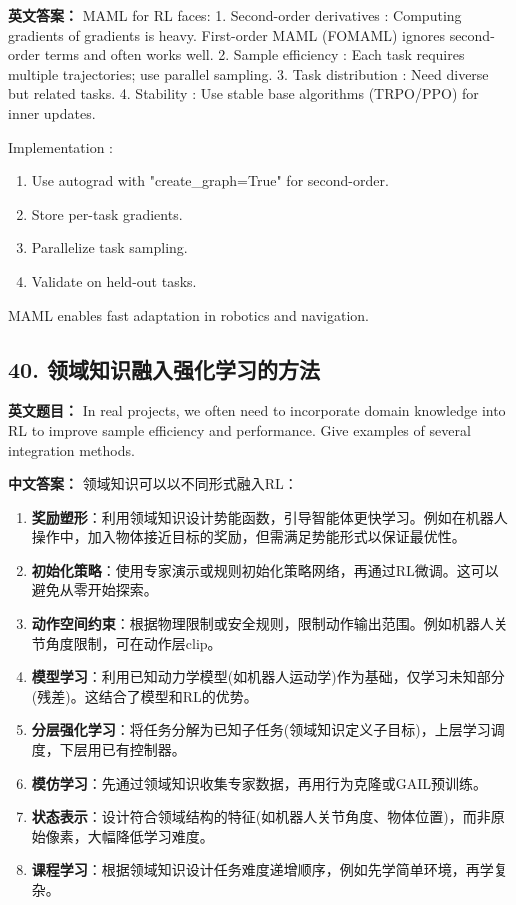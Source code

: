 \documentclass[10pt,a4paper]{ctexart}
\begin{document}
\textbf{英文答案：}  
MAML for RL faces:
1.  Second-order derivatives : Computing gradients of gradients is heavy. First-order MAML (FOMAML) ignores second-order terms and often works well.
2.  Sample efficiency : Each task requires multiple trajectories; use parallel sampling.
3.  Task distribution : Need diverse but related tasks.
4.  Stability : Use stable base algorithms (TRPO/PPO) for inner updates.

 Implementation :
\begin{enumerate}
    \item Use autograd with "create_graph=True" for second-order.
    \item Store per-task gradients.
    \item Parallelize task sampling.
    \item Validate on held-out tasks.
\end{enumerate}

MAML enables fast adaptation in robotics and navigation.

\subsection*{40. 领域知识融入强化学习的方法}
\textbf{英文题目：} In real projects, we often need to incorporate domain knowledge into RL to improve sample efficiency and performance. Give examples of several integration methods.

\textbf{中文答案：}  
领域知识可以以不同形式融入RL：
\begin{enumerate}
    \item \textbf{奖励塑形}：利用领域知识设计势能函数，引导智能体更快学习。例如在机器人操作中，加入物体接近目标的奖励，但需满足势能形式以保证最优性。
    \item \textbf{初始化策略}：使用专家演示或规则初始化策略网络，再通过RL微调。这可以避免从零开始探索。
    \item \textbf{动作空间约束}：根据物理限制或安全规则，限制动作输出范围。例如机器人关节角度限制，可在动作层clip。
    \item \textbf{模型学习}：利用已知动力学模型(如机器人运动学)作为基础，仅学习未知部分(残差)。这结合了模型和RL的优势。
    \item \textbf{分层强化学习}：将任务分解为已知子任务(领域知识定义子目标)，上层学习调度，下层用已有控制器。
    \item \textbf{模仿学习}：先通过领域知识收集专家数据，再用行为克隆或GAIL预训练。
    \item \textbf{状态表示}：设计符合领域结构的特征(如机器人关节角度、物体位置)，而非原始像素，大幅降低学习难度。
    \item \textbf{课程学习}：根据领域知识设计任务难度递增顺序，例如先学简单环境，再学复杂。
\end{enumerate}
\end{document}
